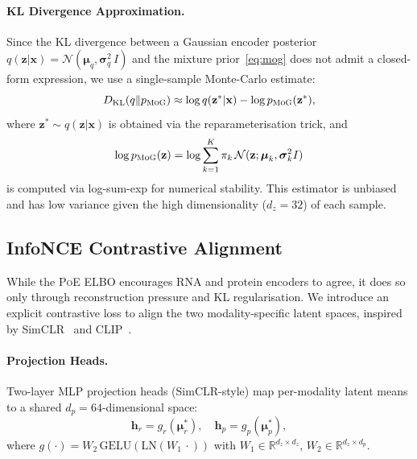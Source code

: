 \documentclass[11pt,a4paper]{article}
\newcommand{\mog}{\textsc{MoG}}
\newcommand{\poe}{\textsc{PoE}}
\newcommand{\RR}{\mathbb{R}}
\newcommand{\bx}{\mathbf{x}}
\newcommand{\bz}{\mathbf{z}}
\newcommand{\bmu}{\boldsymbol{\mu}}
\newcommand{\bsig}{\boldsymbol{\sigma}}
\begin{document}
\paragraph{KL Divergence Approximation.}
Since the KL divergence between a Gaussian encoder posterior $q(\bz|\bx) = \mathcal{N}(\bmu_q, \bsig_q^2\,I)$ and the mixture prior~\eqref{eq:mog} does not admit a closed-form expression, we use a single-sample Monte-Carlo estimate:
\begin{equation}\label{eq:kl_mog}
  D_\text{KL}(q \| p_{\mog}) \approx \log q(\bz^*|\bx) - \log p_{\mog}(\bz^*),
\end{equation}
where $\bz^* \sim q(\bz|\bx)$ is obtained via the reparameterisation trick, and
\begin{equation}\label{eq:log_mog}
  \log p_{\mog}(\bz) = \log\sum_{k=1}^{K}\pi_k\,\mathcal{N}(\bz;\bmu_k,\bsig_k^2 I)
\end{equation}
is computed via log-sum-exp for numerical stability.
This estimator is unbiased and has low variance given the high dimensionality ($d_z=32$) of each sample.

\subsection{InfoNCE Contrastive Alignment}\label{ssec:infonce}

While the \poe{} ELBO encourages RNA and protein encoders to agree, it does so only through reconstruction pressure and KL regularisation.
We introduce an explicit contrastive loss to align the two modality-specific latent spaces, inspired by SimCLR~\citep{chen2020} and CLIP~\citep{radford2021}.

\paragraph{Projection Heads.}
Two-layer MLP projection heads (SimCLR-style) map per-modality latent means to a shared $d_p=64$-dimensional space:
\begin{equation}
  \mathbf{h}_r = g_r(\bmu_r^*), \quad \mathbf{h}_p = g_p(\bmu_p^*),
\end{equation}
where $g(\cdot) = W_2\,\text{GELU}(\text{LN}(W_1\,\cdot))$ with $W_1 \in \RR^{d_z\times d_z}$, $W_2 \in \RR^{d_z\times d_p}$.
\end{document}
